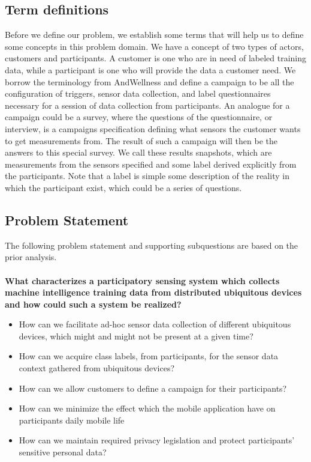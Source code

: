 \subsection{Term definitions}
Before we define our problem, we establish some terms that will help us to define some concepts in this problem domain. We have a concept of two types of actors, customers and participants. A customer is one who are in need of labeled training data, while a participant is one who will provide the data a customer need. We borrow the terminology from AndWellness \parencite{hicks2010andwellness} and define a campaign to be all the configuration of triggers, sensor data collection, and label questionnaires necessary for a session of data collection from participants. An analogue for a campaign could be a survey, where the questions of the questionnaire, or interview, is a campaigns specification defining what sensors the customer wants to get measurements from. The result of such a campaign will then be the answers to this special survey. We call these results snapshots, which are measurements from the sensors specified and some label derived explicitly from the participants. Note that a label is simple some description of the reality in which the participant exist, which could be a series of questions.

\subsection{Problem Statement}
\label{sub:problem_statement}
The following problem statement and supporting subquestions are based on the prior analysis.
\\\\
\textbf{What characterizes a participatory sensing system which collects machine intelligence training data from distributed ubiquitous devices and how could such a system be realized?}

\begin{itemize}
    \item How can we facilitate ad-hoc sensor data collection of different ubiquitous devices, which might and might not be present at a given time?

    \item How can we acquire class labels, from participants, for the sensor data context gathered from ubiquitous devices?  
    
    \item How can we allow customers to define a campaign for their participants?
    
    \item How can we minimize the effect which the mobile application have on participants daily mobile life

    \item How can we maintain required privacy legislation and protect participants' sensitive personal data? 
\end{itemize}

